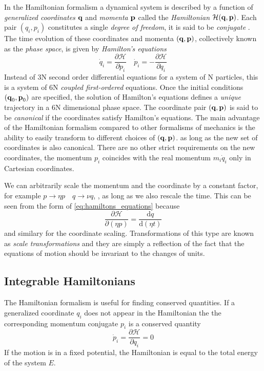 \documentclass[ twoside,openright,titlepage,numbers=noenddot,headinclude,%
                footinclude=true,cleardoublepage=empty,abstractoff, %
                BCOR=5mm,paper=a4,fontsize=11pt,%
                american,%
                ]{scrreprt}
\begin{document}
In the Hamiltonian formalism a dynamical system is described by 
a function of \emph{generalized coordinates} $\boldsymbol{\mathbf{q}}$ and \emph{momenta} 
$\boldsymbol{\mathbf{p}}$ called the \emph{Hamiltonian} $\mathcal{H}(\boldsymbol{\mathbf{q}},
\boldsymbol{\mathbf{p}})$. Each pair $(q_i,p_i)$ constitutes a single 
\emph{degree of freedom}, it is said to be \emph{conjugate} . 
The time evolution of these coordinates and 
momenta
$(\boldsymbol{\mathbf{q}},\boldsymbol{\mathbf{p}})$, collectively known as the \emph{phase space},
is given by \emph{Hamilton's equations} 
\begin{equation}
    \dot{q}_i= \frac{\partial \mathcal{H}}{\partial p_i}\quad
    \dot{p}_i= -\frac{\partial \mathcal{H}}{\partial q_i} 
    \label{eq:hamiltons_equations}
\end{equation}
Instead of 3N second order differential equations for a system of N particles,
this is a system of
6N \emph{coupled first-ordered} equations. Once the initial conditions
$(\boldsymbol{\mathbf{q}}_0,\boldsymbol{\mathbf{p}}_0)$ are specified, the solution of Hamilton's 
equations defines a \emph{unique} trajectory in a 
6N dimensional phase space. The coordinate pair $(\boldsymbol{\mathbf{q}},\boldsymbol{\mathbf{p}})$
is said to be \emph{canonical} if the coordinates satisfy 
Hamilton's equations. The main advantage of the Hamiltonian
formalism compared to other formalisms of mechanics is the ability
to easily transform to different choices of $(\boldsymbol{\mathbf{q}},\boldsymbol{\mathbf{p}})$.
as long as the new set of coordinates is also canonical. There are no
other strict requirements on the new coordinates, the momentum 
$p_i$ coincides with the real momentum $m_i \dot{q}_i$ only in
Cartesian coordinates.

We can arbitrarily scale the momentum and the coordinate by a 
constant factor, for example $p\rightarrow\eta p\quad q\rightarrow\nu q$, 
, as long as we also
rescale the time. This can be seen from the form of 
\cref{eq:hamiltons_equations} because
\begin{equation}
    \frac{\partial \mathcal{H}}{\partial (\eta p)}= 
    \frac{\mathrm{d}q}{\mathrm{d}(\eta t)}  
    \label{eq:rescaling_hamiltonian}
\end{equation}
and similary for the coordinate scaling. Transformations of this
type are known as \emph{scale transformations} and they are simply 
a reflection of the fact that the equations of motion should be invariant
to the changes of units.
\subsection{Integrable Hamiltonians}
The Hamiltonian formalism is useful for finding conserved quantities.
If a generalized coordinate $q_i$ does not appear in the Hamiltonian
the the corresponding momentum conjugate $p_i$ is a conserved quantity
\begin{equation}
    \dot{p}_i= \frac{\partial \mathcal{H}}{\partial q_i} =0
\end{equation}
If the motion is in a fixed potential, the Hamiltonian is equal
to the total energy of the system $E$.
\end{document}
